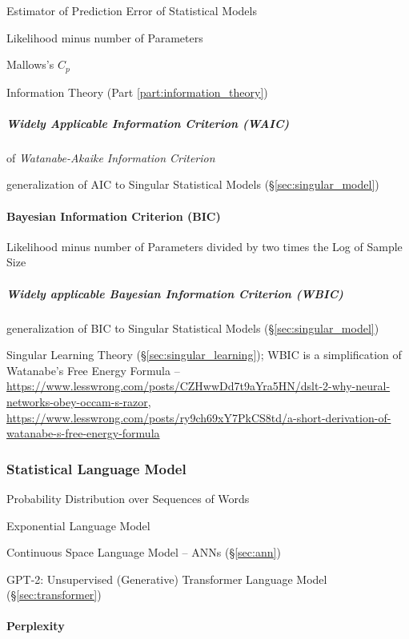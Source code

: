 Estimator of Prediction Error of Statistical Models

Likelihood minus number of Parameters

Mallows's $C_p$

\fist Information Theory (Part \ref{part:information_theory})



\subparagraph{Widely Applicable Information Criterion (WAIC)}
\label{sec:waic}\hfill

of \emph{Watanabe-Akaike Information Criterion}

generalization of AIC to Singular Statistical Models
(\S\ref{sec:singular_model})



\paragraph{Bayesian Information Criterion (BIC)}\label{sec:bic}\hfill

Likelihood minus number of Parameters divided by two times the Log of Sample
Size



\subparagraph{Widely applicable Bayesian Information Criterion (WBIC)}
\label{sec:wbic}\hfill

generalization of BIC to Singular Statistical Models
(\S\ref{sec:singular_model})

Singular Learning Theory (\S\ref{sec:singular_learning}); WBIC is a simplification of Watanabe's Free Energy Formula --
\url{https://www.lesswrong.com/posts/CZHwwDd7t9aYra5HN/dslt-2-why-neural-networks-obey-occam-s-razor},
\url{https://www.lesswrong.com/posts/ry9ch69xY7PkCS8td/a-short-derivation-of-watanabe-s-free-energy-formula}




\subsubsection{Statistical Language Model}
\label{sec:statistical_language_model}

Probability Distribution over Sequences of Words

Exponential Language Model

Continuous Space Language Model -- ANNs (\S\ref{sec:ann})

GPT-2: Unsupervised (Generative) Transformer Language Model
(\S\ref{sec:transformer})



\paragraph{Perplexity}\label{sec:perplexity}\hfill

